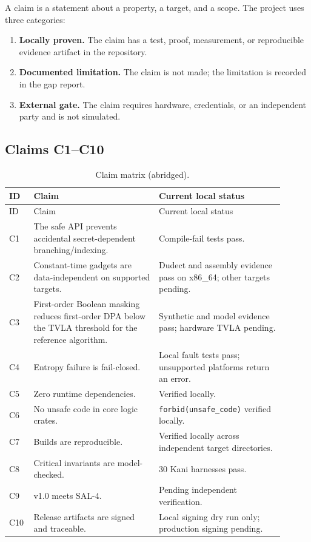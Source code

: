 \documentclass[11pt,a4paper]{article}
\newcommand{\code}[1]{\texttt{#1}}
\theoremstyle{plain}
\theoremstyle{definition}
\theoremstyle{remark}
\begin{document}
A claim is a statement about a property, a target, and a scope. The project uses three
categories:

\begin{enumerate}[leftmargin=1.5em]
  \item \textbf{Locally proven.} The claim has a test, proof, measurement, or
        reproducible evidence artifact in the repository.
  \item \textbf{Documented limitation.} The claim is not made; the limitation is
        recorded in the gap report.
  \item \textbf{External gate.} The claim requires hardware, credentials, or an
        independent party and is not simulated.
\end{enumerate}

\subsection{Claims C1--C10}

\begin{longtable}{@{}p{0.06\linewidth}p{0.42\linewidth}p{0.42\linewidth}@{}}
\caption{Claim matrix (abridged).}\label{tab:claims}\\
\toprule
ID & Claim & Current local status \\
\midrule
\endfirsthead
\toprule
ID & Claim & Current local status \\
\midrule
\endhead
C1 & The safe API prevents accidental secret-dependent branching/indexing. &
Compile-fail tests pass. \\
C2 & Constant-time gadgets are data-independent on supported targets. &
Dudect and assembly evidence pass on x86\_64; other targets pending. \\
C3 & First-order Boolean masking reduces first-order DPA below the TVLA threshold for
the reference algorithm. &
Synthetic and model evidence pass; hardware TVLA pending. \\
C4 & Entropy failure is fail-closed. &
Local fault tests pass; unsupported platforms return an error. \\
C5 & Zero runtime dependencies. &
Verified locally. \\
C6 & No unsafe code in core logic crates. &
\code{forbid(unsafe\_code)} verified locally. \\
C7 & Builds are reproducible. &
Verified locally across independent target directories. \\
C8 & Critical invariants are model-checked. &
30 Kani harnesses pass. \\
C9 & v1.0 meets SAL-4. &
Pending independent verification. \\
C10 & Release artifacts are signed and traceable. &
Local signing dry run only; production signing pending. \\
\bottomrule
\end{longtable}
\end{document}
